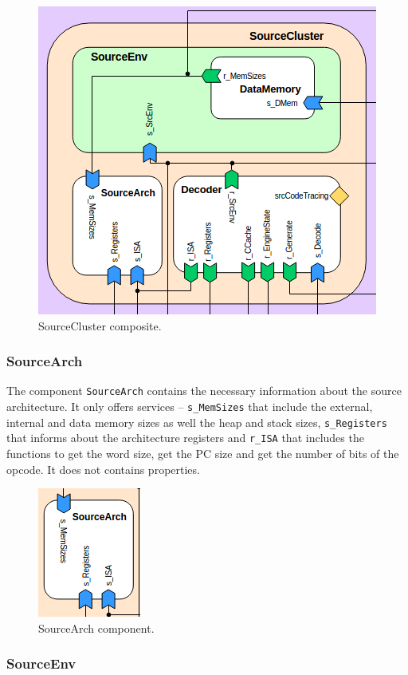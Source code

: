 \documentclass{report}
\begin{document}
		\begin{figure} [H]
			\centering
			\includegraphics[width=0.6\linewidth]{Images/arch-ref/SourceCluster}
			\caption{SourceCluster composite.}
			\label{fig:SourceCluster}
		\end{figure}
		
			\subsubsection{SourceArch}
			
			The component \texttt{SourceArch} contains the necessary information about the source architecture. It only offers services -- \texttt{s\_MemSizes} that include the external, internal and data memory sizes as well the heap and stack sizes, \texttt{s\_Registers} that informs about the architecture registers and \texttt{r\_ISA} that includes the functions to get the word size, get the PC size and get the number of bits of the opcode. It does not contains properties.
			
			\begin{figure} [H]
				\centering
				\includegraphics[width=0.25\linewidth]{Images/arch-ref/SourceArch}
				\caption{SourceArch component.}
				\label{fig:SourceArch}
			\end{figure}
		
			\subsubsection{SourceEnv}
			
\end{document}

